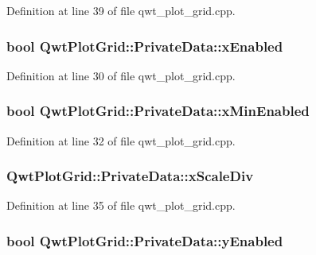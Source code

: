 Definition at line 39 of file qwt\-\_\-plot\-\_\-grid.\-cpp.

\hypertarget{class_qwt_plot_grid_1_1_private_data_af51ab508f94f1c30b46a8acb5a0883f4}{
\subsubsection[{x\-Enabled}]{\setlength{\rightskip}{0pt plus 5cm}bool Qwt\-Plot\-Grid\-::\-Private\-Data\-::x\-Enabled}}\label{class_qwt_plot_grid_1_1_private_data_af51ab508f94f1c30b46a8acb5a0883f4}


Definition at line 30 of file qwt\-\_\-plot\-\_\-grid.\-cpp.

\hypertarget{class_qwt_plot_grid_1_1_private_data_af33d554ededc86d3129d3217e3e81222}{
\subsubsection[{x\-Min\-Enabled}]{\setlength{\rightskip}{0pt plus 5cm}bool Qwt\-Plot\-Grid\-::\-Private\-Data\-::x\-Min\-Enabled}}\label{class_qwt_plot_grid_1_1_private_data_af33d554ededc86d3129d3217e3e81222}


Definition at line 32 of file qwt\-\_\-plot\-\_\-grid.\-cpp.

\hypertarget{class_qwt_plot_grid_1_1_private_data_a184c4c520bc0fc54030c800873aa454c}{
\subsubsection[{x\-Scale\-Div}]{ Qwt\-Plot\-Grid\-::\-Private\-Data\-::x\-Scale\-Div}}\label{class_qwt_plot_grid_1_1_private_data_a184c4c520bc0fc54030c800873aa454c}


Definition at line 35 of file qwt\-\_\-plot\-\_\-grid.\-cpp.

\hypertarget{class_qwt_plot_grid_1_1_private_data_ad237c21fc1336a6b00634cfe4d894131}{
\subsubsection[{y\-Enabled}]{\setlength{\rightskip}{0pt plus 5cm}bool Qwt\-Plot\-Grid\-::\-Private\-Data\-::y\-Enabled}}\label{class_qwt_plot_grid_1_1_private_data_ad237c21fc1336a6b00634cfe4d894131}


